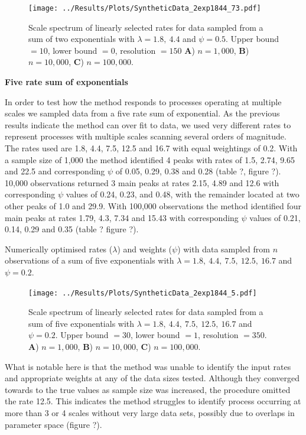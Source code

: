 \documentclass[11pt,usenames,dvipsnames]{article}
\begin{document}
\begin{figure}[H]
	\centering
	\texttt{[image: ../Results/Plots/SyntheticData\_2exp1844\_73.pdf]}
	\caption{Scale spectrum of linearly selected rates for data sampled from a sum of two exponentials with $\lambda = 1.8,\ 4.4$ and $\psi = 0.5$. Upper bound $= 10$, lower bound $= 0$, resolution $= 150$ \textbf{A}) $n = 1,000$, \textbf{B}) $n = 10,000$,  \textbf{C}) $n = 100,000$.}
\end{figure}

\noindent
\textbf{Five rate sum of exponentials}
\begin{linenumbers}

In order to test how the method responds to processes operating at multiple scales we sampled data from a five rate sum of exponential. As the previous results indicate the method can over fit to data, we used very different rates to represent processes with multiple scales scanning several orders of magnitude. The rates used are 1.8, 4.4, 7.5, 12.5 and 16.7 with equal weightings of 0.2. With a sample size of 1,000 the method identified 4 peaks with rates of 1.5, 2.74, 9.65 and 22.5 and corresponding $\psi$ of 0.05, 0.29, 0.38 and 0.28 (table ?, figure ?). 10,000 observations returned 3 main peaks at rates 2.15, 4.89 and 12.6 with corresponding $\psi$ values of 0.24, 0.23, and 0.48, with the remainder located at two other peaks of 1.0 and 29.9. With 100,000 observations the method identified four main peaks at rates 1.79, 4.3, 7.34 and 15.43 with corresponding $\psi$ values of 0.21, 0.14, 0.29 and 0.35 (table ? figure ?). 
\end{linenumbers}
\begin{table}[H]
	\centering
	\caption{Numerically optimised rates ($\lambda$) and weights ($\psi$) with data sampled from $n$ observations of a sum of five exponentials with $\lambda = 1.8,\ 4.4,\ 7.5,\ 12.5,\ 16.7$ and $\psi = 0.2$.}
	
\end{table}
\begin{figure}[H]
	\centering
	\texttt{[image: ../Results/Plots/SyntheticData\_2exp1844\_5.pdf]}
	\caption{Scale spectrum of linearly selected rates for data sampled from a sum of five exponentials with $\lambda = 1.8,\ 4.4,\ 7.5,\ 12.5,\ 16.7$ and $\psi = 0.2$. Upper bound $= 30$, lower bound $= 1$, resolution $= 350$. \textbf{A}) $n = 1,000$, \textbf{B}) $n = 10,000$,  \textbf{C}) $n = 100,000$.}
\end{figure}
\begin{linenumbers}

What is notable here is that the method was unable to identify the input rates and appropriate weights at any of the data sizes tested. Although they converged towards to the true values as sample size was increased, the procedure omitted the rate 12.5. This indicates the method struggles to identify process occurring at more than 3 or 4 scales without very large data sets, possibly due to overlaps in parameter space (figure ?).
\end{linenumbers}
\end{document}
